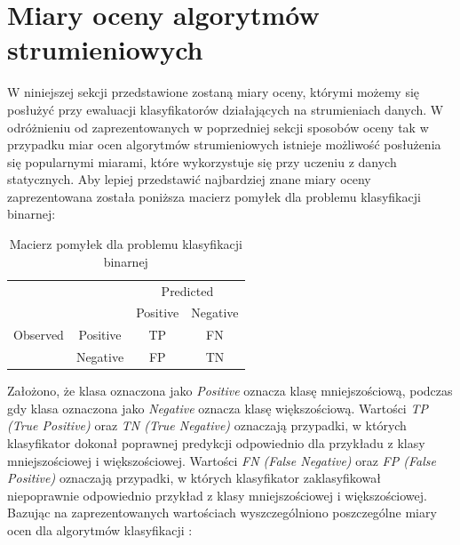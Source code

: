\section{Miary oceny algorytmów strumieniowych}

\noindent W niniejszej sekcji przedstawione zostaną miary oceny, którymi możemy się posłużyć przy ewaluacji klasyfikatorów działających na strumieniach danych. W odróżnieniu od zaprezentowanych w poprzedniej sekcji sposobów oceny tak w przypadku miar ocen algorytmów strumieniowych istnieje możliwość posłużenia się popularnymi miarami, które wykorzystuje się przy uczeniu z danych statycznych. Aby lepiej przedstawić najbardziej znane miary oceny zaprezentowana została poniższa macierz pomyłek dla problemu klasyfikacji binarnej:

\newpage

\begin{center}
\begin{table}[h]
\renewcommand{\arraystretch}{1.5}
\label{tab:macierz}
\begin{center}
\begin{tabular}{|c|c|c|c|}
   \cline{3-4} 
   \multicolumn{1}{c}{} & & \multicolumn{2}{c|}{Predicted} \\ \cline{3-4}
   \multicolumn{1}{c}{} & & Positive & Negative \\ \hline
   
   {Observed}
   & Positive & TP & FN \\ \cline{2-4}
   & Negative & FP & TN  \\ \cline{2-4} \hline
\end{tabular}
\caption{Macierz pomyłek dla problemu klasyfikacji binarnej}
\end{center}
\end{table}
\end{center}

\noindent Założono, że klasa oznaczona jako \textit{Positive} oznacza klasę mniejszościową, podczas gdy klasa oznaczona jako \textit{Negative} oznacza klasę większościową. Wartości \textit{TP (True Positive)} oraz \textit{TN (True Negative)} oznaczają przypadki, w których klasyfikator dokonał poprawnej predykcji odpowiednio dla przykładu z klasy mniejszościowej i większościowej. Wartości \textit{FN (False Negative)} oraz \textit{FP (False Positive)} oznaczają przypadki, w których klasyfikator zaklasyfikował niepoprawnie odpowiednio przykład z klasy mniejszościowej i większościowej. Bazując na zaprezentowanych wartościach wyszczególniono poszczególne miary ocen dla algorytmów klasyfikacji \cite{Inbook:Metrics}:

